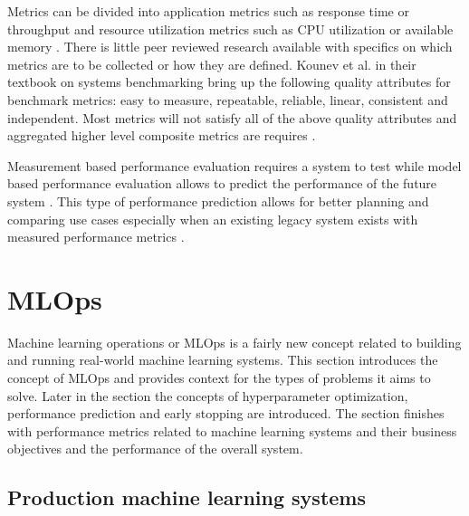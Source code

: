 Metrics can be divided into application metrics such as response time or throughput and resource utilization metrics such as CPU utilization or available memory \parencite{brunnertPerformanceorientedDevOpsResearch2015}. There is little peer reviewed research available with specifics on which metrics are to be collected or how they are defined. Kounev et al. \parencite*{kounevSystemsBenchmarkingScientists2020} in their textbook on systems benchmarking bring up the following quality attributes for benchmark metrics: easy to measure, repeatable, reliable, linear, consistent and independent. Most metrics will not satisfy all of the above quality attributes and aggregated higher level composite metrics are requires \parencite{kounevSystemsBenchmarkingScientists2020}.

Measurement based performance evaluation requires a system to test while model based performance evaluation allows to predict the performance of the future system \parencite{brunnertPerformanceorientedDevOpsResearch2015}. This type of performance prediction allows for better planning and comparing use cases especially when an existing legacy system exists with measured performance metrics \parencite{brunnertPerformanceorientedDevOpsResearch2015}.


\section{MLOps} %
\label{sec:mldevops}

Machine learning operations or MLOps is a fairly new concept related to building and running real-world machine learning systems. This section introduces the concept of MLOps and provides context for the types of problems it aims to solve. Later in the section the concepts of hyperparameter optimization, performance prediction and early stopping are introduced. The section finishes with performance metrics related to machine learning systems and their business objectives and the performance of the overall system.

\subsection{Production machine learning systems}


